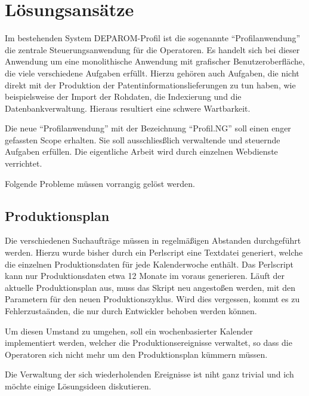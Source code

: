 
\chapter{Lösungsansätze} %

\label{ch:Lösungsansätze} %


Im bestehenden System DEPAROM-Profil ist die sogenannte "`Profilanwendung"' die
zentrale Steuerungsanwendung für die Operatoren. Es handelt sich bei dieser
Anwendung um eine monolithische Anwendung mit grafischer Benutzeroberfläche, die
viele verschiedene Aufgaben erfüllt. Hierzu gehören auch Aufgaben, die nicht
direkt mit der Produktion der Patentinformationslieferungen zu tun haben, wie
beispielsweise der Import der Rohdaten, die Indexierung und die
Datenbankverwaltung. Hieraus resultiert eine schwere Wartbarkeit.

Die neue "`Profilanwendung"' mit der Bezeichnung "`Profil.NG"' soll einen enger
gefassten Scope erhalten. Sie soll ausschliesßlich verwaltende und steuernde
Aufgaben erfüllen. Die eigentliche Arbeit wird durch einzelnen Webdienste
verrichtet.

Folgende Probleme müssen vorrangig gelöst werden.

\section{Produktionsplan}
\label{ch:Lösungsansätze:Produktionsplan}

Die verschiedenen Suchaufträge müssen in regelmäßigen Abstanden durchgeführt
werden. Hierzu wurde bisher durch ein Perlscript eine Textdatei generiert,
welche die einzelnen Produktionsdaten für jede Kalenderwoche enthält. Das
Perlscript kann nur Produktionsdaten etwa 12 Monate im voraus generieren. Läuft
der aktuelle Produktionsplan aus, muss das Skript neu angestoßen werden, mit den
Parametern für den neuen Produktionszyklus. Wird dies vergessen, kommt es zu
Fehlerzustaänden, die nur durch Entwickler behoben werden können.

Um diesen Umstand zu umgehen, soll ein wochenbasierter Kalender implementiert
werden, welcher die Produktionsereignisse verwaltet, so dass die Operatoren sich
nicht mehr um den Produktionsplan kümmern müssen.

Die Verwaltung der sich wiederholenden Ereignisse ist niht ganz trivial und ich
möchte einige Lösungsideen diskutieren.

